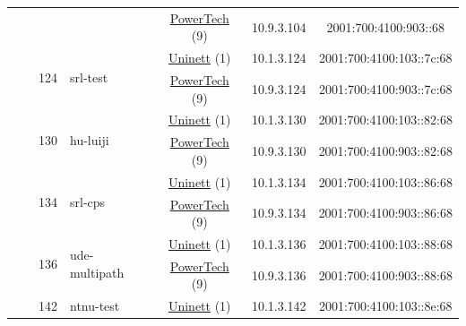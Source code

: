 \begin{small}
\begin{center}
\begin{longtable}{|c|c|c|c|c|c|c|c|}
  &  & \multicolumn{2}{|c|}{} & \multicolumn{2}{|c|}{\tiny{\href{http://www.powertech.no}{PowerTech} (9)}} & \tiny{10.9.3.104} & \tiny{2001:700:4100:903::68} \\* \cline{3-3}\cline{4-4}\cline{5-5}\cline{6-6}\cline{7-7}\cline{8-8}
  &  & \multirow{2}{*}{\tiny{124}} & \multicolumn{1}{|l|}{\multirow{2}{*}{\tiny{srl-test}}} & \multicolumn{2}{|c|}{\tiny{\href{https://www.uninett.no}{Uninett} (1)}} & \tiny{10.1.3.124} & \tiny{2001:700:4100:103::7c:68} \\* \cline{5-5}\cline{6-6}\cline{7-7}\cline{8-8}
  &  &  &  & \multicolumn{2}{|c|}{\tiny{\href{http://www.powertech.no}{PowerTech} (9)}} & \tiny{10.9.3.124} & \tiny{2001:700:4100:903::7c:68} \\* \cline{3-3}\cline{4-4}\cline{5-5}\cline{6-6}\cline{7-7}\cline{8-8}
  &  & \multirow{2}{*}{\tiny{130}} & \multicolumn{1}{|l|}{\multirow{2}{*}{\tiny{hu-luiji}}} & \multicolumn{2}{|c|}{\tiny{\href{https://www.uninett.no}{Uninett} (1)}} & \tiny{10.1.3.130} & \tiny{2001:700:4100:103::82:68} \\* \cline{5-5}\cline{6-6}\cline{7-7}\cline{8-8}
  &  &  &  & \multicolumn{2}{|c|}{\tiny{\href{http://www.powertech.no}{PowerTech} (9)}} & \tiny{10.9.3.130} & \tiny{2001:700:4100:903::82:68} \\* \cline{3-3}\cline{4-4}\cline{5-5}\cline{6-6}\cline{7-7}\cline{8-8}
  &  & \multirow{2}{*}{\tiny{134}} & \multicolumn{1}{|l|}{\multirow{2}{*}{\tiny{srl-cps}}} & \multicolumn{2}{|c|}{\tiny{\href{https://www.uninett.no}{Uninett} (1)}} & \tiny{10.1.3.134} & \tiny{2001:700:4100:103::86:68} \\* \cline{5-5}\cline{6-6}\cline{7-7}\cline{8-8}
  &  &  &  & \multicolumn{2}{|c|}{\tiny{\href{http://www.powertech.no}{PowerTech} (9)}} & \tiny{10.9.3.134} & \tiny{2001:700:4100:903::86:68} \\* \cline{3-3}\cline{4-4}\cline{5-5}\cline{6-6}\cline{7-7}\cline{8-8}
  &  & \multirow{2}{*}{\tiny{136}} & \multicolumn{1}{|l|}{\multirow{2}{*}{\tiny{ude-multipath}}} & \multicolumn{2}{|c|}{\tiny{\href{https://www.uninett.no}{Uninett} (1)}} & \tiny{10.1.3.136} & \tiny{2001:700:4100:103::88:68} \\* \cline{5-5}\cline{6-6}\cline{7-7}\cline{8-8}
  &  &  &  & \multicolumn{2}{|c|}{\tiny{\href{http://www.powertech.no}{PowerTech} (9)}} & \tiny{10.9.3.136} & \tiny{2001:700:4100:903::88:68} \\* \cline{3-3}\cline{4-4}\cline{5-5}\cline{6-6}\cline{7-7}\cline{8-8}
  &  & \multirow{2}{*}{\tiny{142}} & \multicolumn{1}{|l|}{\multirow{2}{*}{\tiny{ntnu-test}}} & \multicolumn{2}{|c|}{\tiny{\href{https://www.uninett.no}{Uninett} (1)}} & \tiny{10.1.3.142} & \tiny{2001:700:4100:103::8e:68} \\* \cline{5-5}\cline{6-6}\cline{7-7}\cline{8-8}

\end{longtable}
\end{center}
\end{small}
